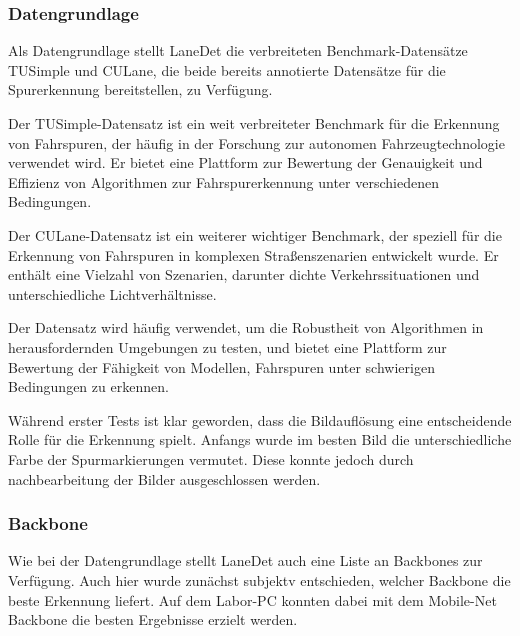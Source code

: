 \documentclass{article}
\begin{document}
            \subsubsection{Datengrundlage}
                Als Datengrundlage stellt LaneDet die verbreiteten Benchmark-Datensätze TUSimple  und CULane, die beide bereits annotierte Datensätze für die Spurerkennung bereitstellen, zu Verfügung.
                
                Der TUSimple-Datensatz ist ein weit verbreiteter Benchmark für die Erkennung von Fahrspuren, der häufig in der Forschung zur autonomen Fahrzeugtechnologie verwendet wird. Er bietet eine Plattform zur Bewertung der Genauigkeit und Effizienz von Algorithmen zur Fahrspurerkennung unter verschiedenen Bedingungen.
                \cite{Long2021The} \cite{Lee2021Robust} \cite{Liu2024Fast}

                Der CULane-Datensatz ist ein weiterer wichtiger Benchmark, der speziell für die Erkennung von Fahrspuren in komplexen Straßenszenarien entwickelt wurde. Er enthält eine Vielzahl von Szenarien, darunter dichte Verkehrssituationen und unterschiedliche Lichtverhältnisse.
                \cite{Long2021The} \cite{Lee2021Robust} \cite{Zhou2024Unsupervised}

                Der Datensatz wird häufig verwendet, um die Robustheit von Algorithmen in herausfordernden Umgebungen zu testen, und bietet eine Plattform zur Bewertung der Fähigkeit von Modellen, Fahrspuren unter schwierigen Bedingungen zu erkennen.
                \cite{Zhao2024StructLane} \cite{Lin2021Semi-Supervised}

  
            Während erster Tests ist klar geworden, dass die Bildauflösung eine entscheidende Rolle für die Erkennung spielt. Anfangs wurde im besten Bild die unterschiedliche Farbe der Spurmarkierungen vermutet. Diese konnte jedoch durch nachbearbeitung der Bilder ausgeschlossen werden.

            \subsubsection{Backbone}
            Wie bei der Datengrundlage stellt LaneDet auch eine Liste an Backbones zur Verfügung. Auch hier wurde zunächst subjektv entschieden, welcher Backbone die beste Erkennung liefert.
            Auf dem Labor-PC konnten dabei mit dem Mobile-Net Backbone die besten Ergebnisse erzielt werden.
\end{document}
